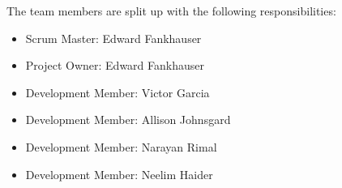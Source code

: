 \begin{flushleft}
The team members are split up with the following responsibilities:
\end{flushleft}
\begin{itemize}
	\item Scrum Master: Edward Fankhauser
	\item Project Owner: Edward Fankhauser
	\item Development Member: Victor Garcia
	\item Development Member: Allison Johnsgard
	\item Development Member: Narayan Rimal
	\item Development Member: Neelim Haider
\end{itemize}
